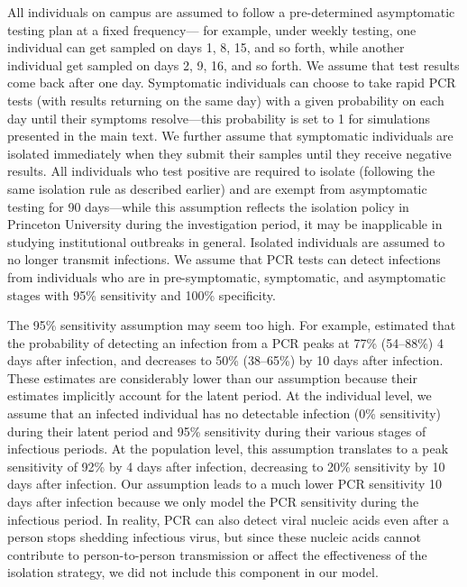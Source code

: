 \documentclass[12pt]{article}
\begin{document}
All individuals on campus are assumed to follow a pre-determined asymptomatic testing plan at a fixed frequency---
for example, under weekly testing, one individual can get sampled on days 1, 8, 15, and so forth, while another individual get sampled on days 2, 9, 16, and so forth.
We assume that test results come back after one day.
Symptomatic individuals can choose to take rapid PCR tests (with results returning on the same day) with a given probability on each day until their symptoms resolve---this probability is set to 1 for simulations presented in the main text.
We further assume that symptomatic individuals are isolated immediately when they submit their samples until they receive negative results.
All individuals who test positive are required to isolate (following the same isolation rule as described earlier) and are exempt from asymptomatic testing for 90 days---while this assumption reflects the isolation policy in Princeton University during the investigation period, it may be inapplicable in studying institutional outbreaks in general.
Isolated individuals are assumed to no longer transmit infections.
We assume that PCR tests can detect infections from individuals who are in pre-symptomatic, symptomatic, and asymptomatic stages with 95\% sensitivity and 100\% specificity.

The 95\% sensitivity assumption may seem too high. 
For example, \cite{hellewell2021estimating} estimated that the probability of detecting an infection from a PCR peaks at 77\% (54–88\%) 4 days after infection, and decreases to 50\% (38–65\%) by 10 days after infection.
These estimates are considerably lower than our assumption because their estimates implicitly account for the latent period.
At the individual level, we assume that an infected individual has no detectable infection (0\% sensitivity) during their latent period and 95\% sensitivity during their various stages of infectious periods.
At the population level, this assumption translates to a peak sensitivity of 92\% by 4 days after infection, decreasing to 20\% sensitivity by 10 days after infection.
Our assumption leads to a much lower PCR sensitivity 10 days after infection because we only model the PCR sensitivity during the infectious period.
In reality, PCR can also detect viral nucleic acids even after a person stops shedding infectious virus, but since these nucleic acids cannot contribute to person-to-person transmission or affect the effectiveness of the isolation strategy, we did not include this component in our model.
\end{document}
